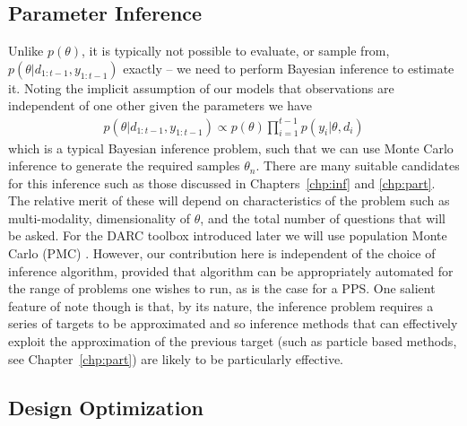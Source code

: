 \subsection{Parameter Inference}
\label{sec:design:auto:inf}

Unlike $p\left(\theta\right)$, it is typically not possible to evaluate, or sample from, $p\left(\theta | d_{1:t-1}, y_{1:t-1}\right)$ exactly -- we need to perform Bayesian inference to estimate it.  Noting
the implicit assumption of our models that observations are independent of one other given the
parameters we have
\begin{align}
p\left(\theta | d_{1:t-1}, y_{1:t-1}\right) \propto p(\theta) \prod_{i=1}^{t-1} p(y_i | \theta, d_i)
\end{align}
which is a typical Bayesian inference problem, such that we can use Monte Carlo inference
to generate the required samples $\theta_n$.
There are many suitable candidates for this inference such as those discussed in Chapters~\ref{chp:inf} and
\ref{chp:part}.
The relative merit of these will depend on
characteristics of the problem such as multi-modality, dimensionality of $\theta$, and the total
number of questions that will be asked.  For the DARC toolbox introduced later we will use 
population Monte Carlo (PMC) \citep{cappe2004population}.  However, our contribution here is independent of
the choice of inference algorithm, provided that algorithm can be appropriately automated for the range
of problems one wishes to run, as is the case for a PPS.  One salient feature of note though is
that, by its nature, the inference problem requires a series of targets to be approximated and so
inference methods that can effectively exploit the approximation of the previous target (such as particle
based methods, see Chapter~\ref{chp:part}) are likely to be particularly effective.

\subsection{Design Optimization}
\label{sec:design:auto:optimization}

